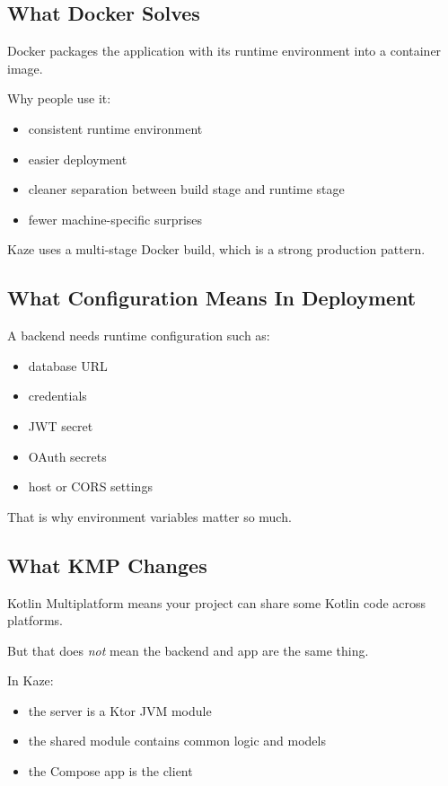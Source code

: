 \documentclass[11pt,a4paper]{article}
\begin{document}
\subsection{What Docker Solves}

Docker packages the application with its runtime environment into a container image.

Why people use it:
\begin{itemize}
    \item consistent runtime environment
    \item easier deployment
    \item cleaner separation between build stage and runtime stage
    \item fewer machine-specific surprises
\end{itemize}

Kaze uses a multi-stage Docker build, which is a strong production pattern.

\subsection{What Configuration Means In Deployment}

A backend needs runtime configuration such as:
\begin{itemize}
    \item database URL
    \item credentials
    \item JWT secret
    \item OAuth secrets
    \item host or CORS settings
\end{itemize}

That is why environment variables matter so much.

\subsection{What KMP Changes}

Kotlin Multiplatform means your project can share some Kotlin code across platforms.

But that does \emph{not} mean the backend and app are the same thing.

In Kaze:
\begin{itemize}
    \item the server is a Ktor JVM module
    \item the shared module contains common logic and models
    \item the Compose app is the client
\end{itemize}
\end{document}
